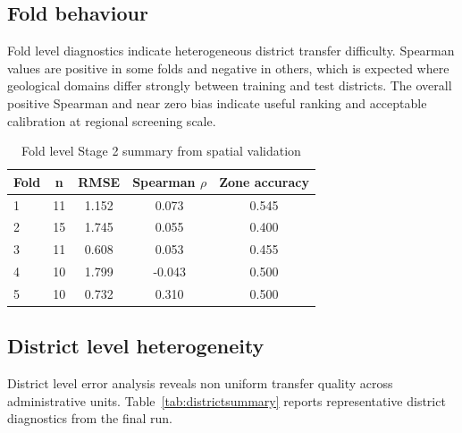 \documentclass[preprint,12pt]{elsarticle}
\begin{document}
\subsection{Fold behaviour}
Fold level diagnostics indicate heterogeneous district transfer difficulty. Spearman values are positive in some folds and negative in others, which is expected where geological domains differ strongly between training and test districts. The overall positive Spearman and near zero bias indicate useful ranking and acceptable calibration at regional screening scale.

\begin{table}[h]
\centering
\caption{Fold level Stage 2 summary from spatial validation}
\label{tab:foldsummary}
\begin{tabular}{lcccc}
\toprule
Fold & n & RMSE & Spearman $\rho$ & Zone accuracy \\
\midrule
1 & 11 & 1.152 & 0.073 & 0.545 \\
2 & 15 & 1.745 & 0.055 & 0.400 \\
3 & 11 & 0.608 & 0.053 & 0.455 \\
4 & 10 & 1.799 & -0.043 & 0.500 \\
5 & 10 & 0.732 & 0.310 & 0.500 \\
\bottomrule
\end{tabular}
\end{table}

\subsection{District level heterogeneity}
District level error analysis reveals non uniform transfer quality across administrative units. Table~\ref{tab:districtsummary} reports representative district diagnostics from the final run.
\end{document}

